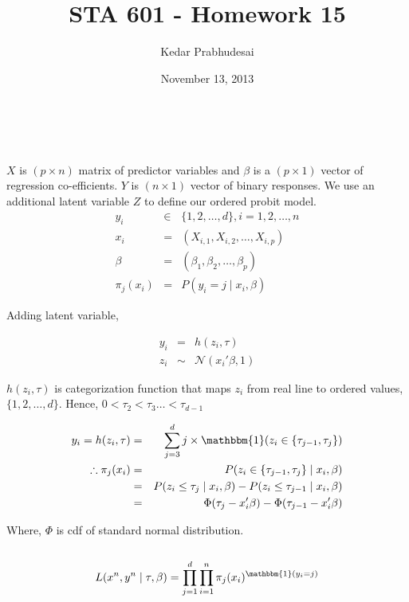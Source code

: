 \documentclass{article}
\title{STA 601 - Homework 15}
\author{Kedar Prabhudesai}
\date{November 13, 2013}
\begin{document}
\maketitle

\\

\\

$X$ is $(p \times n)$ matrix of predictor variables and $\beta$ is a $(p \times 1)$ vector of regression co-efficients. $Y$ is $(n \times 1)$ vector of binary responses. We use an additional latent variable $Z$ to define our ordered probit model.\\

\begin{eqnarray*}
y_i &\in& \{1,2,\ldots,d\},i = 1,2,\ldots,n\\
x_i &=& (X_{i,1},X_{i,2},\ldots,X_{i,p})\\
\beta &=& (\beta_1,\beta_2,\ldots,\beta_p)\\
\pi_j(x_i) &=& P(y_i = j \mid x_i,\beta)
\end{eqnarray*}

Adding latent variable,

\begin{eqnarray*}
y_i &=& h(z_i,\tau)\\
z_i &\sim& \mathcal{N}(x_i'\beta,1)
\end{eqnarray*}

$h(z_i,\tau)$ is categorization function that maps $z_i$ from real line to ordered values, $\{1,2,\ldots,d\}.$ Hence, $0 < \tau_2 < \tau_3 \ldots < \tau_{d-1}$

\begin{eqnarray*}
y_i = h(z_i,\tau) &=& \sum_{j=3}^{d}{j \times \mathbbm{1}(z_i \in \{\tau_{j-1},\tau_j\})}\\
\therefore \pi_j(x_i) &=& P(z_i \in \{\tau_{j-1},\tau_j\} \mid x_i,\beta)\\
&=& P(z_i \le \tau_j \mid x_i,\beta) - P(z_i \le \tau_{j-1} \mid x_i,\beta)\\
&=& \Phi(\tau_j - x_i'\beta) - \Phi(\tau_{j-1} - x_i'\beta)
\end{eqnarray*}

Where, $\Phi$ is cdf of standard normal distribution.\\

\\
\begin{eqnarray*}
L(x^n,y^n \mid \tau,\beta) = \prod_{j=1}^d{\prod_{i=1}^n{\pi_j(x_i)^{\mathbbm{1}(y_i = j)}}}
\end{eqnarray*}
\end{document}
